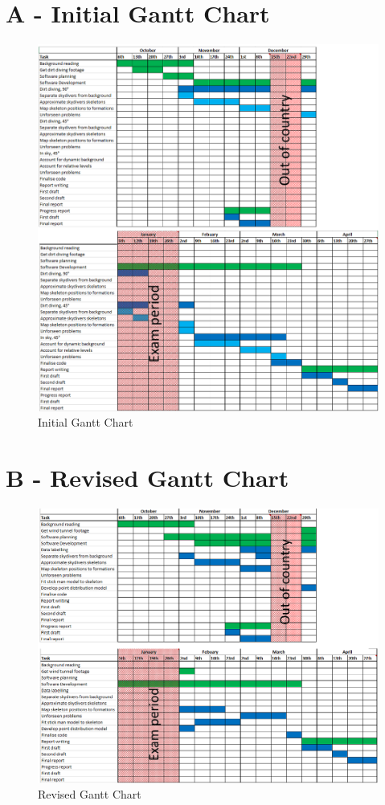 \documentclass[a4paper, 12pt]{article}
\begin{document}
\begin{appendices}
%
\chapter{\textbf{A - Initial Gantt Chart}}
\label{appendix:a}
%
\begin{figure}[H]
	\centering
	\includegraphics[width=\linewidth]{Gantt_initial_split.png}
	\caption{Initial Gantt Chart}
	\label{fig:gantt_initial}
\end{figure}
%
\chapter{\textbf{B - Revised Gantt Chart}}
\label{appendix:b}
%
\begin{figure}[H]
	\centering
	\includegraphics[width=\linewidth]{Gantt_new_split.png}
	\caption{Revised Gantt Chart}
	\label{fig:gantt_new}
\end{figure}
%
%
\end{appendices}
%
\end{document}
